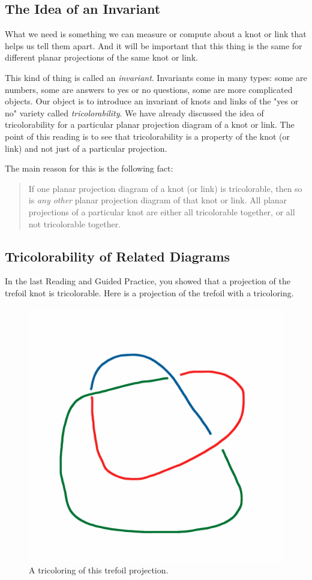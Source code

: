 \documentclass[12pt,letterpaper]{article}
\theoremstyle{definition}
\begin{document}
\subsection*{The Idea of an Invariant}

What we need is something we can measure or compute about a knot or link that helps us tell them apart. And it will be important that this thing is the same for different planar projections of the same knot or link.

This kind of thing is called an \emph{invariant}.
Invariants come in many types: some are numbers, some are answers to yes or no questions, some are more complicated objects. Our object is to introduce an invariant of knots and links of the "yes or no" variety called \emph{tricolorability}.
We have already discussed the idea of tricolorability for a particular planar projection diagram of a knot or link. 
The point of this reading is to see that tricolorability is a property of the knot (or link) and not just of a particular projection.

The main reason for this is the following fact:
\begin{quote}
If one planar projection diagram of a knot (or link) is tricolorable, then so is \emph{any other} planar projection diagram of that knot or link. 
All planar projections of a particular knot are either all tricolorable together, or all not tricolorable together.
\end{quote}

\clearpage

\subsection*{Tricolorability of Related Diagrams}

In the last Reading and Guided Practice, you showed that a projection of the trefoil knot is tricolorable.
Here is a projection of the trefoil with a tricoloring.

\begin{figure}[h]
    \centering
    \includegraphics[width=.4\textwidth]{knotpics/tricolor_trefoil.png}
    \caption{A tricoloring of this trefoil projection.}
\end{figure}
\end{document}
